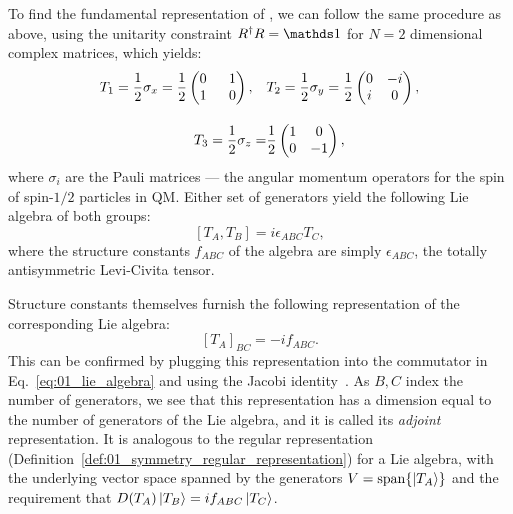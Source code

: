 To find the fundamental representation of \su[2], we can follow the same procedure as above, using the unitarity constraint $R^\dagger R = \identity$ for $N = 2$ dimensional complex matrices, which yields:
\begin{equation}
	\label{eq:01_su2_generators}
	\begin{split}
	\setlength{\arraycolsep}{8pt}
	T_1 = \frac{1}{2}\sigma_x = \frac{1}{2}\begin{pmatrix}
		0 & 1 \\
		1 & 0
	\end{pmatrix}, \quad
	&T_2 = \frac{1}{2}\sigma_y = \frac{1}{2}\begin{pmatrix}
		0 & -i \\
		i & 0
	\end{pmatrix}, \\[1em]
	T_3 = \frac{1}{2}\sigma_z = &\frac{1}{2}\begin{pmatrix}
		1 & 0 \\
		0 & -1
	\end{pmatrix},
\end{split}
\end{equation}
where $\sigma_i$ are the Pauli matrices --- the angular momentum operators for the spin of spin-$1/2$ particles in QM.
Either set of generators yield the following Lie algebra of both groups:
\begin{equation}
	\label{eq:01_so3_su2_lie_algebra}
	[T_A, T_B] = i \epsilon_{ABC} T_C,
\end{equation}
where the structure constants $f_{ABC}$ of the algebra are simply $\epsilon_{ABC}$, the totally antisymmetric Levi-Civita tensor.

Structure constants themselves furnish the following representation of the corresponding Lie algebra:
\begin{equation}
	\label{eq:01_adjoint}
	[T_A]_{BC} = -i f_{ABC}.
\end{equation}
This can be confirmed by plugging this representation into the commutator in Eq.~\ref{eq:01_lie_algebra} and using the Jacobi identity~\cite{Jacobi1862}.
As $B, C$ index the number of generators, we see that this representation has a dimension equal to the number of generators of the Lie algebra, and it is called its \textit{adjoint} representation.
It is analogous to the regular representation (Definition~\ref{def:01_symmetry_regular_representation}) for a Lie algebra, with the underlying vector space spanned by the generators $V = \mathrm{span}\{\ket{T_A}\}$ and the requirement that $D(T_A)\ket{T_B} = i f_{ABC} \ket{T_C}$.

